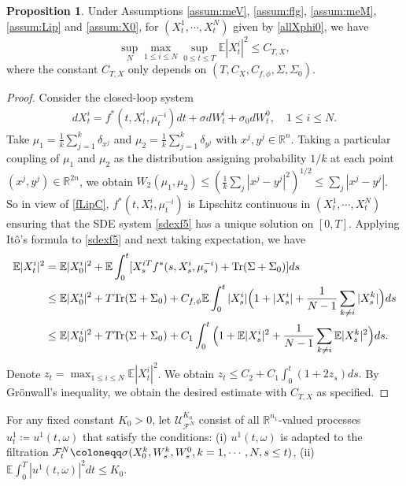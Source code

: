 \documentclass{amsart}
\theoremstyle{definition}
\newtheorem{proposition}[theorem]{Proposition}
\theoremstyle{remark}
\def\cal{\mathcal}
\def\EE{{\mathbb E}}
\numberwithin{equation}{section}
\begin{document}
\begin{proposition} \label{prop:ex2}
Under Assumptions \ref{assum:meV}, \ref{assum:flg}, \ref{assum:meM},  \ref{assum:Lip} and \ref{assum:X0}, for $(X_t^1, \cdots, X_t^N)$ given by \eqref{allXphi0}, we have
$$
\sup_N \max_{1\le i\le N} \sup_{0\le t\le T}\EE|X_t^i|^2\le C_{T,X},
$$
where the constant $C_{T,X}$ only depends on $(T, C_X, C_{f,\phi}, \Sigma, \Sigma_0)$.
\end{proposition}

\begin{proof}
Consider the closed-loop system
\begin{align}
dX_t^i =f^*(t,X_t^i, \mu^{-i}_t)dt + \sigma dW^i_t +\sigma_0 dW^0_t, \quad 1\le i\le N.\label{sdexf5}
\end{align}
Take $\mu_1= \frac{1}{k}\sum_{j=1}^k \delta_{x^j}$ and $\mu_2= \frac{1}{k}\sum_{j=1}^k \delta_{y^j} $ with $x^j,y^j\in \mathbb{R}^n$. Taking a particular coupling of $\mu_1$ and $\mu_2$  as the distribution
assigning probability $1/k$ at each point $(x^j,y^j)\in \mathbb{R}^{2n}$, we obtain $W_2(\mu_1, \mu_2)
\le (\frac{1}{k}\sum_{j}|x^j-y^j|^2)^{1/2}\le \sum_j |x^j-y^j|$. So in view of \eqref{fLipC},  $f^*(t, X_t^i, \mu_t^{-i})$ is Lipschitz continuous in $(X_t^1, \cdots, X_t^N)$
ensuring that the SDE system \eqref{sdexf5} has a unique solution on $[0,T]$.
Applying It\^o's formula to \eqref{sdexf5} and next taking expectation, we have
\begin{align}
\EE|X_t^i|^2 &= \EE|X_0^i|^2 + \EE\int_0^t[ X_s^{iT}f^*(s, X_s^i, \mu_s^{-i})+   {\rm Tr} (\Sigma+\Sigma_0) ]ds\notag \\
   &\le \EE|X_0^i|^2+ T {\rm Tr} (\Sigma+\Sigma_0) +
  C_{f,\phi} \EE\int_0^t |X_s^i| \Big(1+|X_s^i| + \frac{1}{N-1}\sum_{k\ne i} |X^k_s|\Big)ds\notag\\
  & \le \EE|X_0^i|^2+ {T} {\rm Tr} (\Sigma+\Sigma_0) +  C_1 \int_0^t \Big(1+\EE|X_s^i|^2+ \frac{1}{N-1}\sum_{k\ne i}\EE |X_s^k|^2\Big)ds. \notag
\end{align}
Denote $z_t=\max_{1\le i\le N} \EE|X_t^i|^2$. We obtain
$
z_t\le C_2+C_1\int_0^t (1+ 2 z_s)ds.
$
By Gr\"onwall's inequality, we obtain the desired estimate
with $C_{T,X}$ as specified.
\end{proof}


For any fixed constant $K_0>0$,
let
${\cal U}_{\cal F^N}^{K_0}$
consist of all $ \mathbb{R}^{n_1}$-valued processes $u^1_t\coloneqq u^1(t, \omega)$ that satisfy the conditions: (i) $u^1(t,\omega)$ is adapted to the filtration ${\mathcal F}^N_t\coloneqq\sigma(X_0^k,W_s^k,\\ W_s^0, k=1, \cdots, N, s\le t)$, (ii)
$\EE\int_0^T|u^{1} (t, \omega)|^2dt\le K_0.$
\end{document}
